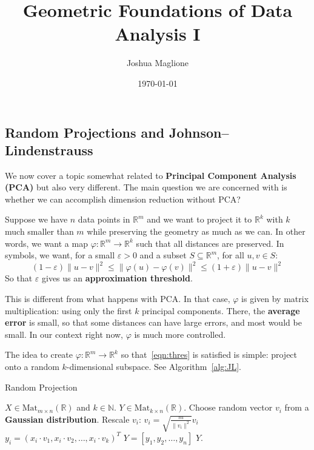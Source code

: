 \documentclass[a4paper, 12pt]{article}
\title{Geometric Foundations of Data Analysis I}
\author{Joshua Maglione}
\date{\today}
\numberwithin{equation}{section}
\numberwithin{figure}{section}
\theoremstyle{definition}
\renewcommand{\leq}{\leqslant}
\newcommand{\N}{\mathbb{N}}
\newcommand{\R}{\mathbb{R}}
\begin{document}
\maketitle
\tableofcontents


\setcounter{section}{3}
\setcounter{subsection}{5}
\setcounter{thm}{16}

\subsection{Random Projections and Johnson--Lindenstrauss}

We now cover a topic somewhat related to \textbf{Principal Component Analysis
(PCA)} but also very different. The main question we are concerned with is
whether we can accomplish dimension reduction without PCA?

Suppose we have $n$ data points in $\R^m$ and we want to project it to $\R^k$
with $k$ much smaller than $m$ while preserving the geometry as much as we can.
In other words, we want a map $\varphi: \R^m \to \R^k$ such that all distances are
preserved. In symbols, we want, for a small $\varepsilon > 0$ and a subset $S
\subseteq \R^m$, for all $u, v \in S$:
\begin{equation}\label{eqn:thres}
	(1 - \varepsilon) \lVert u - v \rVert^2 \leq \lVert \varphi(u) - \varphi(v)
	\rVert^2 \leq (1 + \varepsilon) \lVert u - v \rVert^2
\end{equation}
So that $\varepsilon$ gives us an \textbf{approximation threshold}.

This is different from what happens with PCA. In that case, $\varphi$ is given
by matrix multiplication: using only the first $k$ principal components. There,
the \textbf{average error} is small, so that some distances can have large
errors, and most would be small. In our context right now, $\varphi$ is much
more controlled.

The idea to create $\varphi: \R^m \to \R^k$ so that~\eqref{eqn:thres} is
satisfied is simple: project onto a random $k$-dimensional subspace. See Algorithm~\ref{alg:JL}.

\begin{algorithm}
	\caption{Random Projection}\label{alg:JL}
	\begin{algorithmic}
		\Require $X \in \text{Mat}_{m \times n}(\R)$ and $k \in \N$.
		\Ensure $Y \in \text{Mat}_{k \times n}(\R)$.
			\State Choose random vector $v_i$ from a \textbf{Gaussian distribution}.
			\State Rescale $v_i$: $v_i = \sqrt{\frac{m}{\lVert v_i \rVert^2}} v_i$
		\EndFor
			\State $y_i = (x_i \cdot v_1, x_i \cdot v_2, \dots, x_i \cdot v_k)^T$
		\EndFor
		\State $Y = [y_1, y_2, \dots, y_n]$
		\State \Return $Y$.
	\end{algorithmic}
\end{algorithm}
\end{document}

